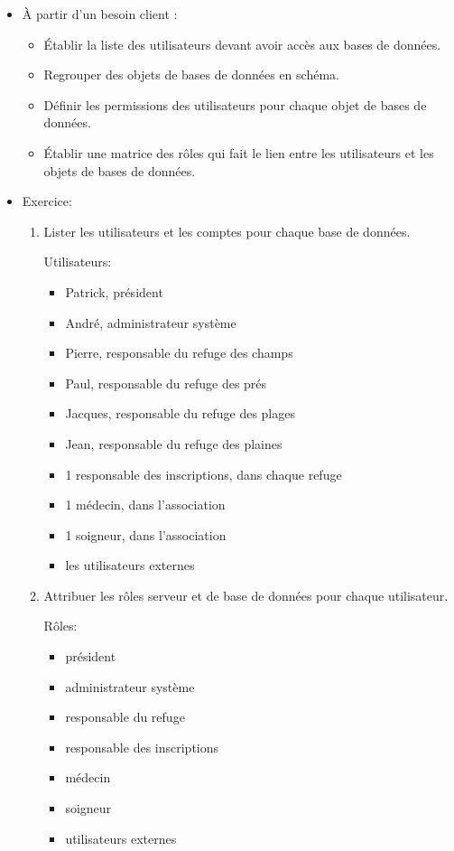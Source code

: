 \documentclass[a4paper]{article}
\begin{document}
\begin{itemize}



\item À partir d’un besoin client :
\begin{itemize}
    \item Établir la liste des utilisateurs devant avoir accès aux bases de données.
    \item Regrouper des objets de bases de données en schéma.
    \item Définir les permissions des utilisateurs pour chaque objet de bases de données.
    \item Établir une matrice des rôles qui fait le lien entre les utilisateurs et les objets de bases de données.
\end{itemize}



\item Exercice:
\begin{enumerate}


\item Lister les utilisateurs et les comptes pour chaque base de données.
\begin{example}
    Utilisateurs:
    \begin{itemize}
        \item Patrick, président
        \item André, administrateur système
        \item Pierre, responsable du refuge des champs
        \item Paul, responsable du refuge des prés
        \item Jacques, responsable du refuge des plages
        \item Jean, responsable du refuge des plaines
        \item 1 responsable des inscriptions, dans chaque refuge
        \item 1 médecin, dans l'association
        \item 1 soigneur, dans l'association
        \item les utilisateurs externes
    \end{itemize}
\end{example}


\item Attribuer les rôles serveur et de base de données pour chaque utilisateur.
\begin{example}
    Rôles:
    \begin{itemize}
        \item président
        \item administrateur système
        \item responsable du refuge
        \item responsable des inscriptions
        \item médecin
        \item soigneur
        \item utilisateurs externes
    \end{itemize}
\end{example}



\end{enumerate}
\end{itemize}
\end{document}
